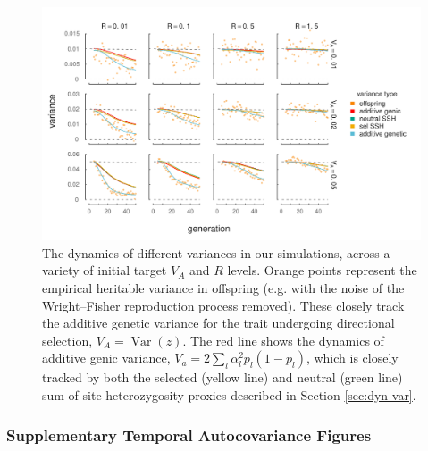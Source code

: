 \documentclass[11pt]{article}
\DeclareMathOperator{\var}{Var}
\begin{document}
\begin{figure}[!ht]
  \centering
  \includegraphics{./images/expfit-vark-types.pdf}
  \caption{The dynamics of different variances in our simulations, across a
    variety of initial target $V_A$ and $R$ levels. Orange points represent the
    empirical heritable variance in offspring (e.g. with the noise of the
    Wright--Fisher reproduction process removed). These closely track the
    additive genetic variance for the trait undergoing directional selection,
    $V_A = \var(z)$. The red line shows the dynamics of additive genic
    variance, $V_a = 2 \sum_l \alpha_l^2 p_l(1-p_l)$, which is closely tracked
  by both the selected (yellow line) and neutral (green line) sum of site
heterozygosity proxies described in Section \ref{sec:dyn-var}.}

  \label{fig:multilocus-expfit-vark}
\end{figure}

\clearpage
\newpage

\subsubsection{Supplementary Temporal Autocovariance Figures}
\end{document}

